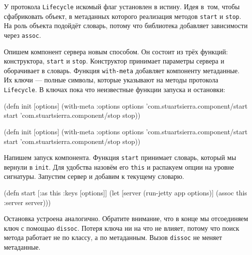 У протокола \verb|Lifecycle| искомый флаг установлен в истину. Идея в~том, чтобы
сфабриковать объект, в метаданных которого реализация методов \verb|start| и
\verb|stop|. На роль объекта подойдёт словарь, потому что библиотека добавляет
зависимости через \verb|assoc|.

Опишем компонент сервера новым способом. Он состоит из трёх функций:
конструктора, \verb|start| и \verb|stop|. Конструктор принимает параметры
сервера и оборачивает в словарь. Функция \verb|with-meta| добавляет компоненту
метаданные. Их ключи — полные символы, которые указывают на методы протокола
\verb|Lifecycle|. В ключах пока что неизвестные функции запуска и остановки:

\ifx\DEVICETYPE\MOBILE

\begin{english}
  \begin{clojure}
(defn init [options]
  (with-meta {:options options}
    {'com.stuartsierra.component/start
     start
     'com.stuartsierra.component/stop
     stop}))
  \end{clojure}
\end{english}

\else

\begin{english}
  \begin{clojure}
(defn init [options]
  (with-meta {:options options}
    {'com.stuartsierra.component/start start
     'com.stuartsierra.component/stop stop}))
  \end{clojure}
\end{english}

\fi

Напишем запуск компонента. Функция \verb|start| принимает словарь, который мы
вернули в \verb|init|. Для удобства назовём его \verb|this| и распакуем опции на
уровне сигнатуры. Запустим сервер и добавим к текущему словарю.

\begin{english}
  \begin{clojure}
(defn start
  [{:as this :keys [options]}]
  (let [server (run-jetty app options)]
    (assoc this :server server)))
  \end{clojure}
\end{english}

Остановка устроена аналогично. Обратите внимание, что в конце мы отсоединяем
ключ с помощью \verb|dissoc|. Потеря ключа ни на что не влияет, потому что поиск
метода работает не по классу, а по метаданным. Вызов \verb|dissoc| не меняет
метаданные.

